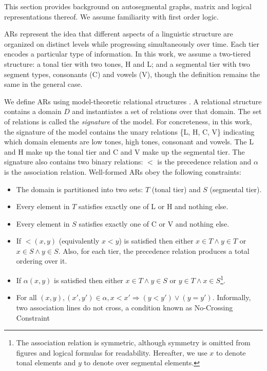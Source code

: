 \documentclass[pmlr]{jmlr}%
\newcommand{\hijeff}[1]{%
	\textcolor{violet}{\textbf{[#1]}}%
}
\begin{document}
	This section provides background on autosegmental graphs,
	matrix and logical representations thereof.
	We assume familiarity with first order logic.
	
	ARs represent the idea that different aspects of a linguistic structure
	are organized on distinct levels while progressing simultaneously over time.
	Each tier encodes a particular type of information. In this 
	work, we assume a two-tiered structure: a tonal tier with two tones, H and L;
	and a segmental tier with two segment types, consonants (C) and vowels (V),
	though the definition remains the same in the general case. 
	
	We define ARs using model-theoretic
	relational structures \citep{jardine2017local}. A relational structure
	contains a domain \(D\) and instantiates a set of relations over that
	domain. The set of relations is called the \emph{signature} of the
	model.
	For concreteness, in this work, the signature of the model contains the unary
	relations \{L, H, C, V\} indicating which domain elements are low
	tones, high tones, consonant and vowels. The L and H make
	up the tonal tier and C and V make up the segmental tier. The
	signature also contains two binary relations: \(<\) is the precedence
	relation and \(\alpha\) is the association relation. Well-formed
	ARs obey the following constraints:
	\begin{itemize}\itemsep-0.5ex
		\item The domain is partitioned into two sets: \(T\) (tonal tier) and \(S\) (segmental tier).
		\item Every element in \(T\) satisfies exactly one of L or H and nothing else.
		\item Every element in \(S\) satisfies exactly one of C or V and nothing else.
		\item If \(<(x,y)\) (equivalently \(x<y\)) is satisfied then either \(x\in T \wedge y\in T\) or \(x\in S  \wedge y\in S\). Also, for each tier, the precedence relation produces a total ordering over it.  
		\item If \(\alpha(x,y)\) is satisfied then either \(x\in T \wedge y\in S\) or \(y\in T \wedge x\in S\)\footnote{The association relation is symmetric, although symmetry is omitted from figures and logical formulas for readability. Hereafter, we use \(x\) to denote tonal elements and \(y\) to denote over segmental elements.}.
		
		\item For all
		\((x, y), (x', y') \in \alpha, x < x' \Rightarrow
		(y < y') ∨ (y =
		y')\). Informally, two association lines do not cross, a condition known as No-Crossing Constraint \citep[NCC,][]{goldsmith1976autosegmental,coleman1991no}
	\end{itemize}
\end{document}
